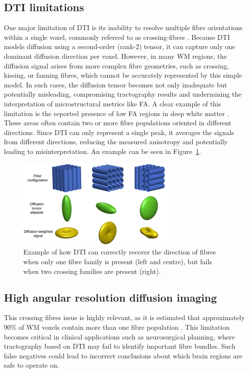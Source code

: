 \subsection{DTI limitations}
One major limitation of DTI is its inability to resolve multiple fibre orientations within a single voxel, commonly referred to as crossing-fibres \cite{Seunarine2013}. Because DTI models diffusion using a second-order (rank-2) tensor, it can capture only one dominant diffusion direction per voxel. However, in many WM regions, the diffusion signal arises from more complex fibre geometries, such as crossing, kissing, or fanning fibres, which cannot be accurately represented by this simple model. In such cases, the diffusion tensor becomes not only inadequate but potentially misleading, compromising tractography results and undermining the interpretation of microstructural metrics like FA. A clear example of this limitation is the reported presence of low FA regions in deep white matter \cite{Mori20148}. These areas often contain two or more fibre populations oriented in different directions. Since DTI can only represent a single peak, it averages the signals from different directions, reducing the measured anisotropy and potentially leading to misinterpretation. An example can be seen in Figure~\ref{fig:crossing}.

\begin{figure}[h]
  \centering
  \includegraphics[width=0.7\textwidth]{Images/crossing.png} %
  \caption{Example of how DTI can correctly recover the direction of fibres when only one fibre family is present (left and centre), but fails when two crossing families are present (right)\cite{Mori20148}.}
  \label{fig:crossing}
\end{figure}

\subsection{High angular resolution diffusion imaging}
This crossing fibres issue is highly relevant, as it is estimated that approximately 90\% of WM voxels contain more than one fibre population \cite{Jeurissen2013}. This limitation becomes critical in clinical applications such as neurosurgical planning, where tractography based on DTI may fail to identify important fibre bundles. Such false negatives could lead to incorrect conclusions about which brain regions are safe to operate on.

